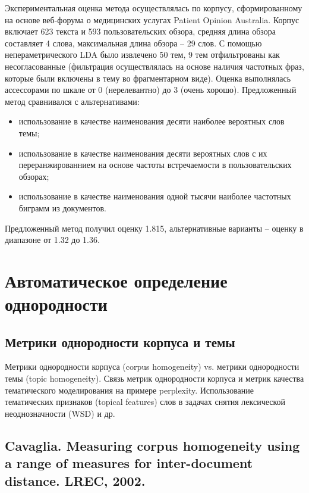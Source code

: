 Экспериментальная оценка метода осуществлялась по корпусу, сформированному на основе веб-форума о медицинских услугах Patient Opinion Australia. Корпус включает 623 текста и 593 пользовательских обзора, средняя длина обзора составляет 4 слова, максимальная длина обзора -- 29 слов. С помощью непераметрического LDA было извлечено 50 тем, 9 тем отфильтрованы как несогласованные (фильтрация осуществлялась на основе наличия частотных фраз, которые были включены в тему во фрагментарном виде). Оценка выполнялась ассессорами по шкале от 0 (нерелевантно) до 3 (очень хорошо). Предложенный метод сравнивался с альтернативами: 
\begin{itemize}
    \item использование в качестве наименования десяти наиболее вероятных слов темы;
    \item использование в качестве наименования десяти вероятных слов с их переранжированнием на основе частоты встречаемости в пользовательских обзорах;
    \item использование в качестве наименования одной тысячи наиболее частотных биграмм из документов.
\end{itemize} 
\noindent Предложенный метод получил оценку 1.815, альтернативные варианты -- оценку в диапазоне от 1.32 до 1.36.

 






\chapter{Автоматическое определение однородности}

\section{Метрики однородности корпуса и темы}

Метрики однородности корпуса (corpus homogeneity) vs. метрики однородности темы (topic homogeneity). Связь метрик однородности корпуса и метрик качества тематического моделирования на примере perplexity. Использование тематических признаков (topical features) слов в задачах снятия лексической неоднозначности (WSD) и др.

\section{Cavaglia. Measuring corpus homogeneity using a range of measures for inter-document distance. LREC, 2002.}

